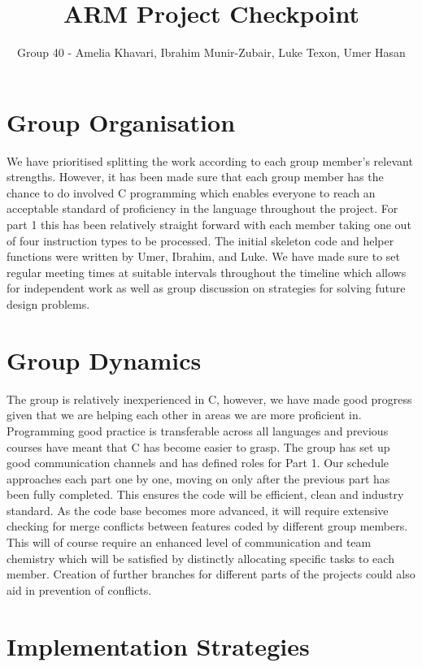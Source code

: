 \documentclass[11pt]{article}
\begin{document}
\title{ARM Project Checkpoint}
\author{Group 40 - Amelia Khavari, Ibrahim Munir-Zubair, Luke Texon, Umer Hasan}

\maketitle

\section{Group Organisation}

We have prioritised splitting the work according to each group member's relevant strengths. However, it has been made sure that each group member has the chance to do involved C programming which enables everyone to reach an acceptable standard of proficiency in the language throughout the project. For part 1 this has been relatively straight forward with each member taking one out of four instruction types to be processed. The initial skeleton code and helper functions were written by Umer, Ibrahim, and Luke. We have made sure to set regular meeting times at suitable intervals throughout the timeline which allows for independent work as well as group discussion on strategies for solving future design problems. 

\section {Group Dynamics}

The group is relatively inexperienced in C, however, we have made good progress given that we are helping each other in areas we are more proficient in. Programming good practice is transferable across all languages and previous courses have meant that C has become easier to grasp. The group has set up good communication channels and has defined roles for Part 1. Our schedule approaches each part one by one, moving on only after the previous part has been fully completed. This ensures the code will be efficient, clean and industry standard. As the code base becomes more advanced, it will require extensive checking for merge conflicts between features coded by different group members. This will of course require an enhanced level of communication and team chemistry which will be satisfied by distinctly allocating specific tasks to each member. Creation of further branches for different parts of the projects could also aid in prevention of conflicts. 

\section{Implementation Strategies}
\end{document}
